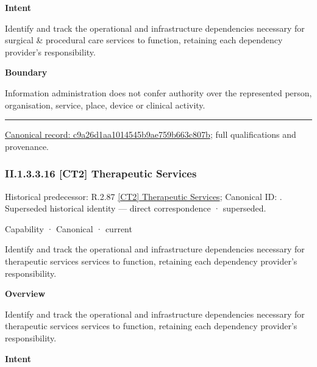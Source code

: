 \textbf{Intent}



Identify and track the operational and infrastructure dependencies necessary for surgical \& procedural care services to function, retaining each dependency provider's responsibility.



\textbf{Boundary}



Information administration does not confer authority over the represented person, organisation, service, place, device or clinical activity.



\medskip\hrule\medskip

{\footnotesize \href{../../../../continuum/strategy/capability/c9a26d1aa1014545b9ae759b663c807b.md}{Canonical record: c9a26d1aa1014545b9ae759b663c807b}; full qualifications and provenance.}\par
\subsubsection*{II.1.3.3.16 [CT2] Therapeutic Services}
\label{navigation:II.1.3.3.16}

{\small Historical predecessor: R.2.87 \hyperref[element:54032b52ee444bfe8b611fb9e8e2ba10]{[CT2] Therapeutic Services}; Canonical ID: \texttt{}. Superseded historical identity — direct correspondence · superseded.}\par
\label{element:b512b6d326004cb7b91a627fe6dbd8be}
{\small Capability · Canonical · current}\par

Identify and track the operational and infrastructure dependencies necessary for therapeutic services services to function, retaining each dependency provider's responsibility.



\textbf{Overview}



Identify and track the operational and infrastructure dependencies necessary for therapeutic services services to function, retaining each dependency provider's responsibility.



\textbf{Intent}



